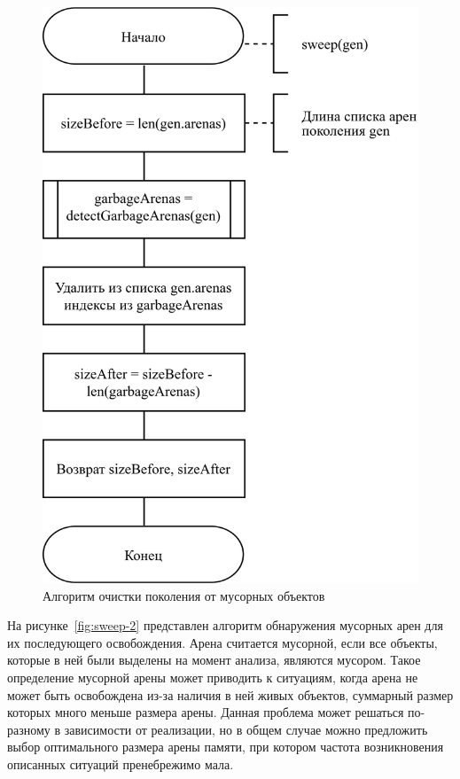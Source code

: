 \begin{figure}[H]
	\centering
	\includegraphics[scale=0.185]{assets/sweep-1.png}
	\caption{Алгоритм очистки поколения от мусорных объектов}
	\label{fig:sweep-1}
\end{figure}

На рисунке~\ref{fig:sweep-2} представлен алгоритм обнаружения мусорных арен для их последующего освобождения. Арена считается мусорной, если все объекты, которые в ней были выделены на момент анализа, являются мусором. Такое определение мусорной арены может приводить к ситуациям, когда арена не может быть освобождена из-за наличия в ней живых объектов, суммарный размер которых много меньше размера арены. Данная проблема может решаться по-разному в зависимости от реализации, но в общем случае можно предложить выбор оптимального размера арены памяти, при котором частота возникновения описанных ситуаций пренебрежимо мала.

